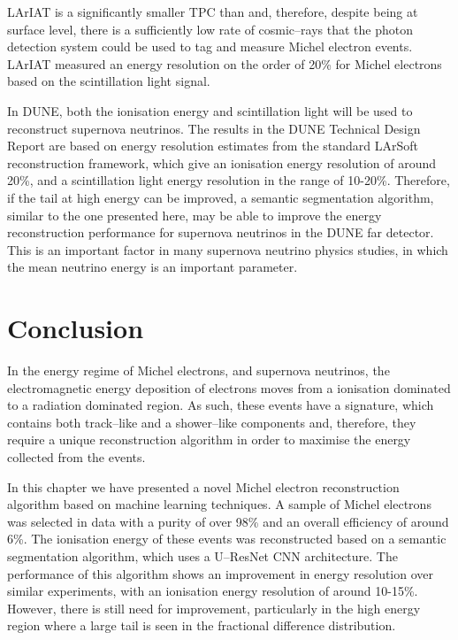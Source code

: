 LArIAT is a significantly smaller TPC than \protodune{} and, therefore, despite
being at surface level, there is a sufficiently low rate of cosmic--rays that the
photon detection system could be used to tag and measure Michel electron events.
LArIAT measured an energy resolution on the order of 20\% for Michel electrons 
based on the scintillation light signal\cite{Foreman_2016}. 

In DUNE, both the ionisation energy and scintillation light will be used to
reconstruct supernova neutrinos. The results in the DUNE Technical Design
Report are based on energy resolution estimates from the standard
LArSoft reconstruction framework, which give an ionisation energy resolution of
around 20\%, and a scintillation light energy resolution in the range of
10-20\%\cite{Abi:2020evt}. Therefore, if the tail at high energy can be 
improved, a semantic segmentation algorithm, similar to the one presented 
here, may be able to improve the energy reconstruction performance for 
supernova neutrinos in the DUNE far detector. This is an important factor in
many supernova neutrino physics studies, in which the mean neutrino energy is an
important parameter\cite{Abi:2020evt}.

\section{Conclusion} \label{ME_EU}

In the energy regime of Michel electrons, and supernova neutrinos, the
electromagnetic energy deposition of electrons moves from a ionisation dominated
to a radiation dominated region. As such, these events have a signature, which
contains both track--like and a shower--like components and, therefore, they 
require a unique reconstruction algorithm in order to maximise the energy 
collected from the events. 

In this chapter we have presented a novel Michel electron reconstruction
algorithm based on machine learning techniques. A sample of Michel electrons was
selected in \protodune{} data with a purity of over 98\% and an overall
efficiency of around 6\%. The ionisation energy of these events was
reconstructed based on a semantic segmentation algorithm, which uses a U--ResNet
CNN architecture. The performance of this algorithm shows an improvement in
energy resolution over similar experiments, with an ionisation energy resolution
of around 10-15\%. However, there is still need for improvement, particularly 
in the high energy region where a large tail is seen in the fractional 
difference distribution. 

